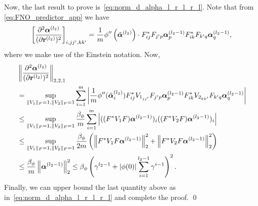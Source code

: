 Now, the last result to prove is~\eqref{eq:norm_d_alpha_l_r_l_r_l}. Note that from \eqref{eq:FNO_predictor_app} we have
    \begin{align*}
        \left[\frac{\partial^2 \boldsymbol{\alpha}^{\left(l_2\right)}}{(\partial \mathbf{r}^{\left(l_2\right)})^2}\right]_{i,jj',kk'}
        =
        \frac{1}{m} \phi^{\prime \prime}\left(\tilde{\boldsymbol{\alpha}}^{\left(l_2\right)}\right) \cdot 
        F_{i j}^* F_{j^{\prime} p} \boldsymbol{\alpha}_p^{\left(l_2-1\right)} 
        F_{i k}^* F_{k^{\prime} q} \boldsymbol{\alpha}_q^{\left(l_2-1\right)},
    \end{align*}
where we make use of the Einstein notation. Now,
    \begin{align}
        \begin{aligned}
            &\left\| 
                \frac{\partial^2 \boldsymbol{\alpha}^{\left(l_2\right)}}{(\partial \mathbf{r}^{\left(l_2\right)})^2}
            \right\|_{2,2,1} \\
            &= 
            \sup_{\|V_1\|_F = 1, \|V_2\|_F = 1} \sum_{i=1}^m
            \left| 
                \frac{1}{m} \phi^{\prime \prime}(\tilde{\boldsymbol{\alpha}}^{(l_2)}_i) F_{i j}^* V_{1_{j j^{\prime}}} F_{j^{\prime} p} \boldsymbol{\alpha}_p^{\left(l_2-1\right)}  
                F_{i k}^* V_{2_{k k^{\prime}}} F_{k^{\prime} q} \boldsymbol{\alpha}_q^{\left(l_2-1\right)}
            \right| \\ 
            &\leq
            \sup_{\|V_1\|_F = 1, \|V_2\|_F = 1}
            \frac{\beta_\phi}{m}
            \sum^m_{i=1}
            \left| 
            ((F^*V_1F)\boldsymbol{\alpha}^{(l_2-1)})_i ((F^*V_2F)\boldsymbol{\alpha}^{(l_2-1)})_i      \right| 
            \\
            &\leq
            \sup_{\|V_1\|_F = 1, \|V_2\|_F = 1}
            \frac{\beta_{\phi}}{2m} \left(\left\|F^* V_1 F \boldsymbol{\alpha}^{\left(l_2 - 1\right)}\right\|_2^2+\left\|F^* V_2 F \boldsymbol{\alpha}^{(l_2-1)}\right\|_2^2\right) \\
            &\leq
            \frac{\beta_{\phi}}{m}\left\|\boldsymbol{\alpha}^{\left(l_2 - 1\right)}\right\|_2^2 \leq \beta_{\phi}
                \left(\gamma^{l_2-1}+|\phi(0)| \sum_{i=1}^{l_2-1} \gamma^{i-1}\right)^2.
        \end{aligned}
    \end{align}
Finally, we can upper bound the last quantity above as in~\eqref{eq:norm_d_alpha_l_r_l_r_l} and complete the proof.
%    
%    
\qed

